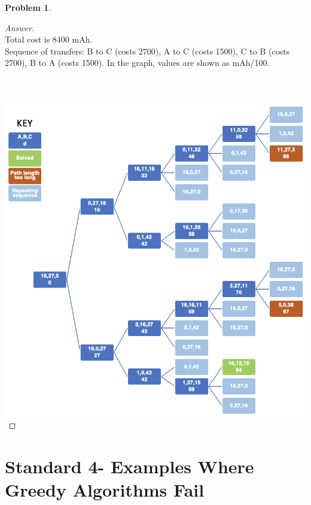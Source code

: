 \documentclass[11pt]{article}
\theoremstyle{definition}
\theoremstyle{definition}
\newtheorem{required}{Problem}
\theoremstyle{definition}
\begin{document}
\begin{required}
\begin{enumerate}[label=(\alph*)]
\begin{proof}[Answer] $ $\\
Total cost is 8400 mAh. \\
Sequence of transfers: B to C (costs 2700), A to C (costs 1500), C to B (costs 2700), B to A (costs 1500). In the graph, values are shown as mAh/100. \\ $ $
\\ $ $\\ $ $ \\
\includegraphics[]{pic1.png}
\end{proof}

\end{enumerate}
\end{required}



\newpage
\section{Standard 4- Examples Where Greedy Algorithms Fail}
\end{document}
